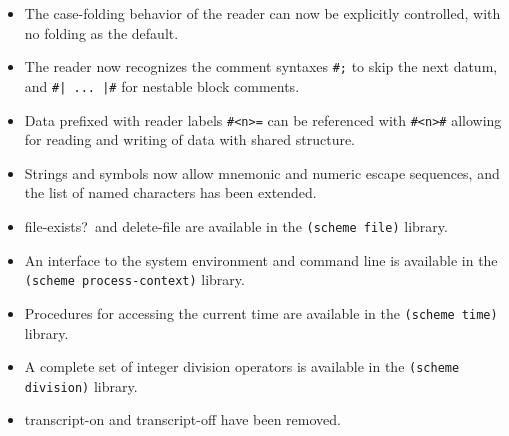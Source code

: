 \begin{itemize}
\item The case-folding behavior of the reader can now be explicitly
controlled, with no folding as the default.

\item The reader now recognizes the comment syntaxes {\tt \#;} to
skip the next datum, and {\tt \#| ... |\#}
for nestable block comments.

\item Data prefixed with reader labels {\tt \#<n>=} can be referenced
with {\tt \#<n>\#} allowing for reading and writing of data with
shared structure.

\item Strings and symbols now allow mnemonic and numeric escape
sequences, and the list of named characters has been extended.

\item {\cf file-exists?}\ and {\cf delete-file} are available in the
{\tt (scheme file)} library.

\item An interface to the system environment and command line is
available in the {\tt (scheme process-context)} library.

\item Procedures for accessing the current time are available in the
{\tt (scheme time)} library.

\item A complete set of integer division operators is available in the
{\tt (scheme division)} library.

\item {\cf transcript-on} and {\cf transcript-off} have been removed.

\end{itemize}

